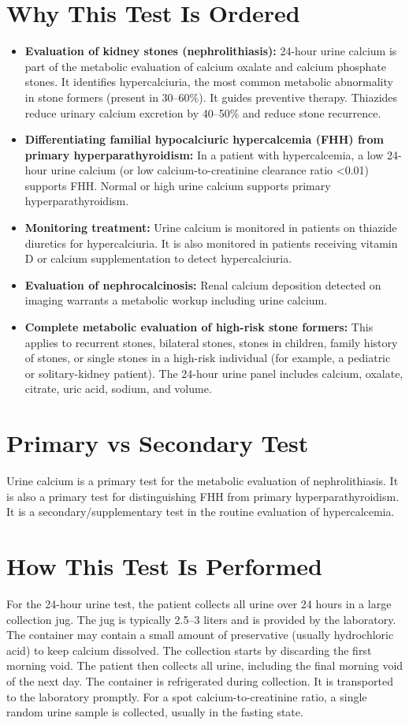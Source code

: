 \section*{Why This Test Is Ordered}
\begin{itemize}
  \item \textbf{Evaluation of kidney stones (nephrolithiasis):} 24-hour urine calcium is part of the metabolic evaluation of calcium oxalate and calcium phosphate stones. It identifies hypercalciuria, the most common metabolic abnormality in stone formers (present in 30--60\%). It guides preventive therapy. Thiazides reduce urinary calcium excretion by 40--50\% and reduce stone recurrence.
  \item \textbf{Differentiating familial hypocalciuric hypercalcemia (FHH) from primary hyperparathyroidism:} In a patient with hypercalcemia, a low 24-hour urine calcium (or low calcium-to-creatinine clearance ratio <0.01) supports FHH. Normal or high urine calcium supports primary hyperparathyroidism.
  \item \textbf{Monitoring treatment:} Urine calcium is monitored in patients on thiazide diuretics for hypercalciuria. It is also monitored in patients receiving vitamin D or calcium supplementation to detect hypercalciuria.
  \item \textbf{Evaluation of nephrocalcinosis:} Renal calcium deposition detected on imaging warrants a metabolic workup including urine calcium.
  \item \textbf{Complete metabolic evaluation of high-risk stone formers:} This applies to recurrent stones, bilateral stones, stones in children, family history of stones, or single stones in a high-risk individual (for example, a pediatric or solitary-kidney patient). The 24-hour urine panel includes calcium, oxalate, citrate, uric acid, sodium, and volume.
\end{itemize}

\section*{Primary vs Secondary Test}
Urine calcium is a primary test for the metabolic evaluation of nephrolithiasis. It is also a primary test for distinguishing FHH from primary hyperparathyroidism. It is a secondary/supplementary test in the routine evaluation of hypercalcemia.

\section*{How This Test Is Performed}
For the 24-hour urine test, the patient collects all urine over 24 hours in a large collection jug. The jug is typically 2.5--3 liters and is provided by the laboratory. The container may contain a small amount of preservative (usually hydrochloric acid) to keep calcium dissolved. The collection starts by discarding the first morning void. The patient then collects all urine, including the final morning void of the next day. The container is refrigerated during collection. It is transported to the laboratory promptly. For a spot calcium-to-creatinine ratio, a single random urine sample is collected, usually in the fasting state.

